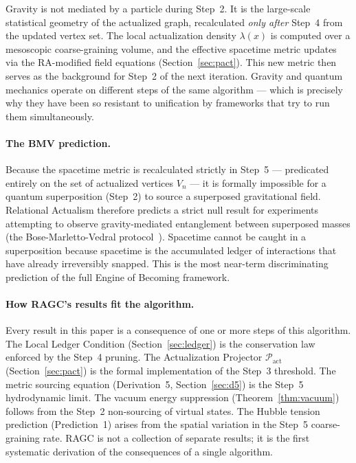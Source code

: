 \documentclass[11pt,a4paper]{article}
\theoremstyle{plain}
\theoremstyle{definition}
\theoremstyle{remark}
\newcommand{\Pact}{\mathcal{P}_{\mathrm{act}}}
\begin{document}
\begin{description}[leftmargin=1.5em, itemsep=4pt]
  \item[\textbf{Step 5 --- The Hydrodynamic Limit (Emergent GR).}]
  Gravity is not mediated by a particle during Step~2. It is the large-scale
  statistical geometry of the actualized graph, recalculated \emph{only after}
  Step~4 from the updated vertex set. The local actualization density
  $\lambda(x)$ is computed over a mesoscopic coarse-graining volume, and the
  effective spacetime metric updates via the RA-modified field equations
  (Section~\ref{sec:pact}). This new metric then serves as the background
  for Step~2 of the next iteration. Gravity and quantum mechanics operate on
  different steps of the same algorithm --- which is precisely why they have
  been so resistant to unification by frameworks that try to run them
  simultaneously.
\end{description}

\paragraph{The BMV prediction.}
Because the spacetime metric is recalculated strictly in Step~5 --- predicated
entirely on the set of actualized vertices $V_n$ --- it is formally impossible
for a quantum superposition (Step~2) to source a superposed gravitational
field. Relational Actualism therefore predicts a strict null result for
experiments attempting to observe gravity-mediated entanglement between
superposed masses (the Bose-Marletto-Vedral protocol~\citep{Bose2017,
Marletto2017}). Spacetime cannot be caught in a superposition because
spacetime is the accumulated ledger of interactions that have already
irreversibly snapped. This is the most near-term discriminating prediction
of the full Engine of Becoming framework.

\paragraph{How RAGC's results fit the algorithm.}
Every result in this paper is a consequence of one or more steps of this
algorithm. The Local Ledger Condition (Section~\ref{sec:ledger}) is the
conservation law enforced by the Step~4 pruning. The Actualization Projector
$\Pact$ (Section~\ref{sec:pact}) is the formal implementation of the
Step~3 threshold. The metric sourcing equation
(Derivation~5, Section~\ref{sec:d5}) is the Step~5 hydrodynamic limit.
The vacuum energy suppression (Theorem~\ref{thm:vacuum}) follows from the
Step~2 non-sourcing of virtual states. The Hubble tension prediction
(Prediction~1) arises from the spatial variation in the Step~5 coarse-graining
rate. RAGC is not a collection of separate results; it is the first systematic
derivation of the consequences of a single algorithm.
\end{document}
